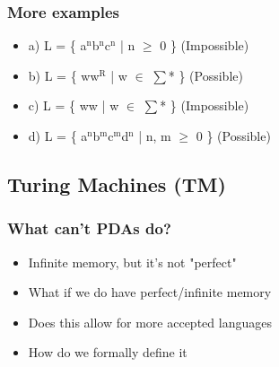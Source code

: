 \documentclass[11pt]{article}
\begin{document}
\subsubsection{More examples}
\label{sec:orgb55a850}
\begin{itemize}
\item a) L = \{ a\(^{\text{n}}\)b\(^{\text{n}}\)c\(^{\text{n}}\) | n \(\ge\) 0 \} (Impossible)
\item b) L = \{ ww\(^{\text{R}}\) | w \(\in\) \(\sum\)* \} (Possible)
\item c) L = \{ ww | w \(\in\) \(\sum\)* \} (Impossible)
\item d) L = \{ a\(^{\text{n}}\)b\(^{\text{m}}\)c\(^{\text{m}}\)d\(^{\text{n}}\) | n, m \(\ge\) 0 \} (Possible)
\end{itemize}
\subsection{Turing Machines (TM)}
\label{sec:org9d56bae}
\subsubsection{What can't PDAs do?}
\label{sec:org1fd5861}
\begin{itemize}
\item Infinite memory, but it's not "perfect"
\item What if we do have perfect/infinite memory
\item Does this allow for more accepted languages
\item How do we formally define it
\end{itemize}
\end{document}
